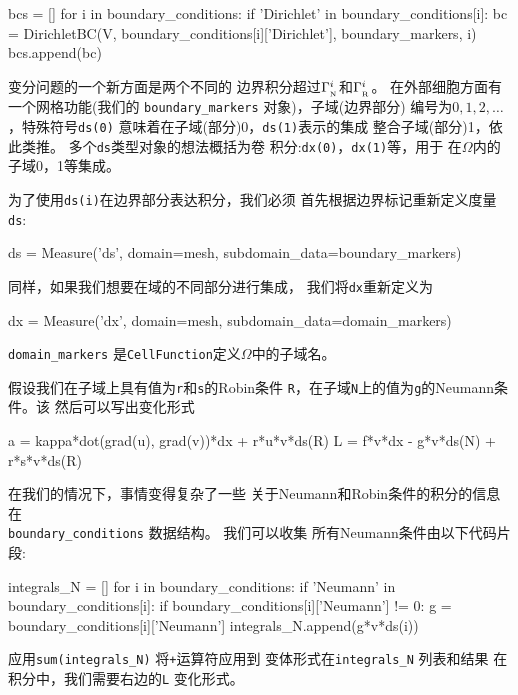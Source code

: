 \begin{python}
bcs = []
for i in boundary_conditions:
    if 'Dirichlet' in boundary_conditions[i]:
        bc = DirichletBC(V, boundary_conditions[i]['Dirichlet'],
                         boundary_markers, i)
        bcs.append(bc)
\end{python}

变分问题的一个新方面是两个不同的
边界积分超过$\Gamma_{_\mathrm{N}}^i$和$\Gamma_{_\mathrm{R}}^i$。
在外部细胞方面有一个网格功能(我们的
\verb!boundary_markers! 对象)，子域(边界部分)
编号为$0,1,2,\ldots$，特殊符号\texttt{ds(0)}
意味着在子域(部分)0，\texttt{ds(1)}表示的集成
整合子域(部分)1，依此类推。
多个\texttt{ds}类型对象的想法概括为卷
积分:\texttt{dx(0)}，\texttt{dx(1)}等，用于
在$\Omega$内的子域0，1等集成。

为了使用\texttt{ds(i)}在边界部分表达积分，我们必须
首先根据边界标记重新定义度量\texttt{ds}:

\begin{python}
ds = Measure('ds', domain=mesh, subdomain_data=boundary_markers)
\end{python}
同样，如果我们想要在域的不同部分进行集成，
我们将\texttt{dx}重新定义为

\begin{python}
dx = Measure('dx', domain=mesh, subdomain_data=domain_markers)
\end{python}
\verb!domain_markers! 是\texttt{CellFunction}定义$\Omega$中的子域名。

假设我们在子域上具有值为\texttt{r}和\texttt{s}的Robin条件
\texttt{R}，在子域\texttt{N}上的值为\texttt{g}的Neumann条件。该
然后可以写出变化形式

\begin{python}
a = kappa*dot(grad(u), grad(v))*dx + r*u*v*ds(R)
L = f*v*dx - g*v*ds(N) + r*s*v*ds(R)
\end{python}

在我们的情况下，事情变得复杂了一些
关于Neumann和Robin条件的积分的信息
在 \\
\verb!boundary_conditions! 数据结构。 我们可以收集
所有Neumann条件由以下代码片段:

\begin{python}
integrals_N = []
for i in boundary_conditions:
    if 'Neumann' in boundary_conditions[i]:
        if boundary_conditions[i]['Neumann'] != 0:
            g = boundary_conditions[i]['Neumann']
            integrals_N.append(g*v*ds(i))
\end{python}
应用\verb!sum(integrals_N)! 将\texttt{+}运算符应用到
变体形式在\verb!integrals_N! 列表和结果
在积分中，我们需要右边的\texttt{L}
变化形式。

